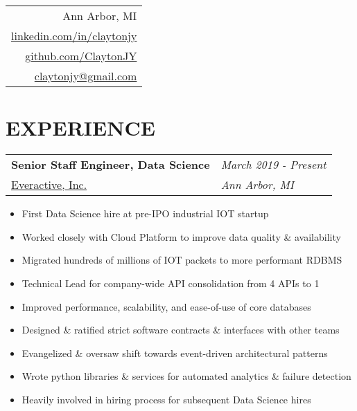\documentclass[margin,line]{res}
\begin{document}


\begin{resume}

\vspace{-.15in}
\hfill
\begin{tabular}{r}
  Ann Arbor, MI\\
  \href{http://www.linkedin.com/in/claytonjy}{linkedin.com/in/claytonjy}\\
  \href{https://github.com/ClaytonJY}{github.com/ClaytonJY} \\
  \href{mailto:claytonjy@gmail.com}{claytonjy@gmail.com} \\
\end{tabular}


\section{EXPERIENCE}

\begin{tabular}{p{4.4in} l}
  {\bf Senior Staff Engineer, Data Science} & \emph{March 2019 - Present}\\
  \href{https://everactive.com/}{Everactive, Inc.} & \emph{Ann Arbor, MI}
\end{tabular}
\vspace{2pt}
\begin{itemize}\itemsep -2pt
  \item First Data Science hire at pre-IPO industrial IOT startup
  \item Worked closely with Cloud Platform to improve data quality \& availability
  \item Migrated hundreds of millions of IOT packets to more performant RDBMS
  \item Technical Lead for company-wide API consolidation from 4 APIs to 1
  \item Improved performance, scalability, and ease-of-use of core databases
  \item Designed \& ratified strict software contracts \& interfaces with other teams
  \item Evangelized \& oversaw shift towards event-driven architectural patterns
  \item Wrote python libraries \& services for automated analytics \& failure detection
  \item Heavily involved in hiring process for subsequent Data Science hires
\end{itemize}


\end{resume}
\end{document}
